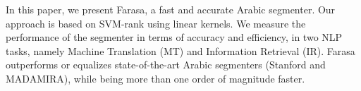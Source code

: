 In this paper, we present Farasa, a fast and accurate Arabic segmenter. Our approach is based on SVM-rank using linear kernels. We measure the performance of the segmenter in terms of accuracy and efficiency, in two NLP tasks, namely Machine Translation (MT) and Information Retrieval (IR). Farasa outperforms or equalizes state-of-the-art Arabic segmenters (Stanford and MADAMIRA), while being more than one order of magnitude faster.
